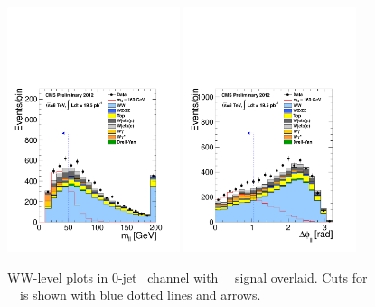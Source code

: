 \begin{figure}[htp]
\includegraphics[width=0.45\textwidth]{figures/hww_analysis16_160_ALL_of_0j_mll.pdf}
\includegraphics[width=0.45\textwidth]{figures/hww_analysis16_160_ALL_of_0j_dphi.pdf}
\caption{ WW-level plots in 0-jet \DF\ channel with ~\GeV\ signal overlaid. 
Cuts for ~\GeV\ is shown with blue dotted lines and arrows. 
}
\label{fig:wwlevelmh160}
\end{figure}

